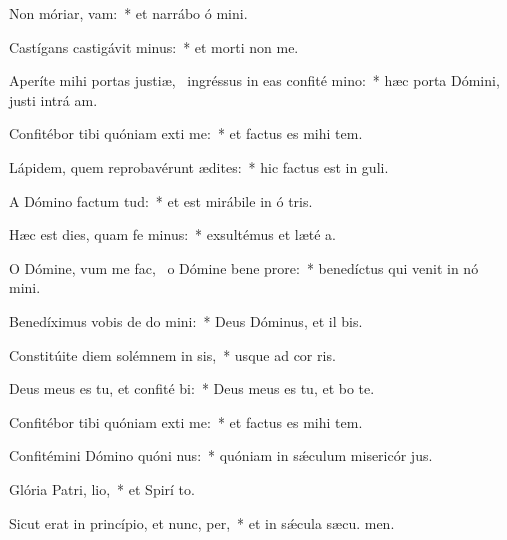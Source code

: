 \item Non móriar,  vam:~* et narrábo ó mini.
\item Castígans castigávit  minus:~* et morti non  me.
\item Aperíte mihi portas justiæ,~\pscross{} ingréssus in eas confité mino:~* hæc porta Dómini, justi intrá  am.
\item Confitébor tibi quóniam exti me:~* et factus es mihi  tem.
\item Lápidem, quem reprobavérunt ædites:~* hic factus est in  guli.
\item A Dómino factum  tud:~* et est mirábile in ó tris.
\item Hæc est dies, quam fe minus:~* exsultémus et læté  a.
\item O Dómine, vum me fac,~\pscross{} o Dómine bene prore:~* benedíctus qui venit in nó mini.
\item Benedíximus vobis de do mini:~* Deus Dóminus, et il bis.
\item Constitúite diem solémnem in sis,~* usque ad cor ris.
\item Deus meus es tu, et confité bi:~* Deus meus es tu, et bo te.
\item Confitébor tibi quóniam exti me:~* et factus es mihi  tem.
\item Confitémini Dómino quóni nus:~* quóniam in sǽculum misericór jus.
\item Glória Patri,  lio,~* et Spirí to.
\item Sicut erat in princípio, et nunc,  per,~* et in sǽcula sæcu. men.
